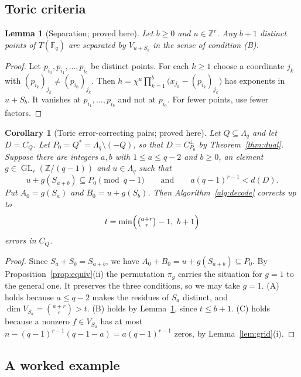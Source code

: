 \documentclass[12pt,letterpaper]{article}
\numberwithin{equation}{section}
\newtheorem{lemma}[theorem]{Lemma}
\newtheorem{corollary}[theorem]{Corollary}
\theoremstyle{definition}
\theoremstyle{remark}
\DeclareMathOperator{\GL}{GL}
\newcommand{\Z}{\mathbb{Z}}
\newcommand{\Fq}{\mathbb{F}_q}
\newcommand{\Lq}{\Lambda_q}
\begin{document}
\subsection{Toric criteria}

\begin{lemma}[Separation; proved here]\label{lem:separate}
Let $b\ge0$ and $u\in\Z^r$. Any $b+1$ distinct points of $T(\Fq)$ are
separated by $V_{u+S_b}$ in the sense of condition (B).
\end{lemma}

\begin{proof}
Let $p_{i_0},p_{i_1},\dots,p_{i_b}$ be distinct points. For each $k\ge1$ choose a
coordinate $j_k$ with $(p_{i_k})_{j_k}\ne(p_{i_0})_{j_k}$. Then
$h=\chi^u\prod_{k=1}^{b}\bigl(x_{j_k}-(p_{i_k})_{j_k}\bigr)$ has exponents in
$u+S_b$. It vanishes at $p_{i_1},\dots,p_{i_b}$ and not at $p_{i_0}$. For
fewer points, use fewer factors.
\end{proof}

\begin{corollary}[Toric error-correcting pairs; proved here]\label{cor:toricECP}
Let $Q\subseteq\Lq$ and let $D=C_Q$. Let $P_0=Q^*=\Lq\setminus(-Q)$, so that
$D=C_{P_0}^\perp$ by Theorem~\ref{thm:dual}. Suppose there are integers $a,b$
with $1\le a\le q-2$ and $b\ge0$, an element $g\in\GL_r(\Z/(q-1))$ and
$u\in\Lq$ such that
\[
u+g(S_{a+b})\subseteq P_0\pmod{q-1}\qquad\text{and}\qquad a(q-1)^{r-1}<d(D).
\]
Put $A_0=g(S_a)$ and $B_0=u+g(S_b)$. Then Algorithm~\ref{alg:decode} corrects
up to
\[
t=\min\Bigl(\tbinom{a+r}{r}-1,\ b+1\Bigr)
\]
errors in $C_Q$.
\end{corollary}

\begin{proof}
Since $S_a+S_b=S_{a+b}$, we have $A_0+B_0=u+g(S_{a+b})\subseteq P_0$. By
Proposition~\ref{prop:equiv}(ii) the permutation $\pi_g$ carries the
situation for $g=1$ to the general one. It preserves the three conditions, so
we may take $g=1$. (A) holds because $a\le q-2$ makes the residues of $S_a$
distinct, and $\dim V_{S_a}=\binom{a+r}{r}>t$. (B) holds by
Lemma~\ref{lem:separate}, since $t\le b+1$. (C) holds because a nonzero
$f\in V_{S_a}$ has at most $n-(q-1)^{r-1}(q-1-a)=a(q-1)^{r-1}$ zeros, by
Lemma~\ref{lem:grid}(i).
\end{proof}

\subsection{A worked example}
\end{document}
